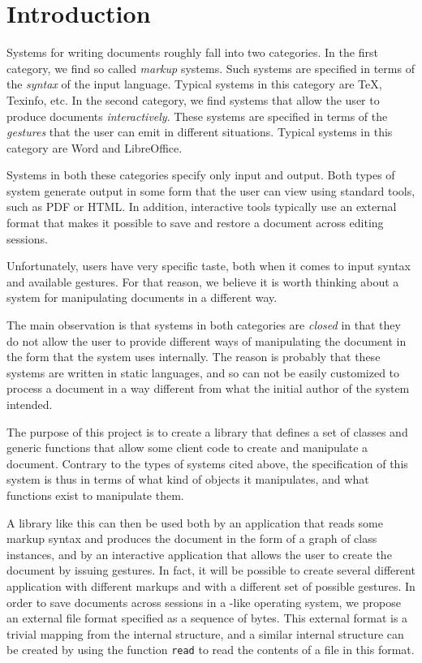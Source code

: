 \chapter{Introduction}
\setcounter{page}{1}%
%
\label{chap-introduction}%

Systems for writing documents roughly fall into two categories.  In
the first category, we find so called \emph{markup} systems.  Such
systems are specified in terms of the \emph{syntax} of the input
language.  Typical systems in this category are TeX, Texinfo, etc.  In
the second category, we find systems that allow the user to produce
documents \emph{interactively}.  These systems are specified in terms
of the \emph{gestures} that the user can emit in different situations.
Typical systems in this category are Word and LibreOffice.

Systems in both these categories specify only input and output.  Both
types of system generate output in some form that the user can view
using standard tools, such as PDF or HTML.  In addition, interactive
tools typically use an external format that makes it possible to save
and restore a document across editing sessions.

Unfortunately, users have very specific taste, both when it comes to
input syntax and available gestures.  For that reason, we believe it
is worth thinking about a system for manipulating documents in a
different way.

The main observation is that systems in both categories are
\emph{closed} in that they do not allow the user to provide different
ways of manipulating the document in the form that the system uses
internally.  The reason is probably that these systems are written in
static languages, and so can not be easily customized to process a
document in a way different from what the initial author of the system
intended.

The purpose of this project is to create a library that defines a set
of classes and generic functions that allow some client code to create
and manipulate a document.  Contrary to the types of systems cited
above, the specification of this system is thus in terms of what kind
of objects it manipulates, and what functions exist to manipulate
them.

A library like this can then be used both by an application that reads
some markup syntax and produces the document in the form of a graph of
class instances, and by an interactive application that allows the
user to create the document by issuing gestures.  In fact, it will be
possible to create several different application with different
markups and with a different set of possible gestures.  In order to
save documents across sessions in a \unix{}-like operating system, we
propose an external file format specified as a sequence of bytes.
This external format is a trivial mapping from the internal structure,
and a similar internal structure can be created by using the
\commonlisp{} function \texttt{read} to read the contents of a
file in this format.

